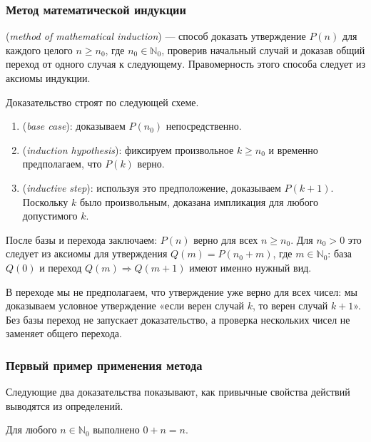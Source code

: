 \subsubsection*{Метод математической индукции}

\begin{definition}
 (\emph{method of mathematical induction}) ---
способ доказать утверждение \(P(n)\) для каждого целого \(n\ge n_0\), где
\(n_0\in\mathbb N_0\), проверив начальный случай и доказав общий переход
от одного случая к следующему. Правомерность этого способа следует из аксиомы индукции.
\end{definition}

Доказательство строят по следующей схеме.
\begin{enumerate}[label=\arabic*.,leftmargin=2em,itemsep=5pt]
\item {} (\emph{base case}): доказываем \(P(n_0)\) непосредственно.
\item {} (\emph{induction hypothesis}):
фиксируем произвольное \(k\ge n_0\) и временно предполагаем, что \(P(k)\) верно.
\item {} (\emph{inductive step}):
используя это предположение, доказываем \(P(k+1)\).
Поскольку \(k\) было произвольным, доказана импликация для любого допустимого \(k\).
\end{enumerate}

После базы и перехода заключаем: \(P(n)\) верно для всех \(n\ge n_0\).
Для \(n_0>0\) это следует из аксиомы для утверждения \(Q(m)=P(n_0+m)\),
где \(m\in\mathbb N_0\): база \(Q(0)\) и переход \(Q(m)\Rightarrow Q(m+1)\)
имеют именно нужный вид.

В переходе мы не предполагаем, что утверждение уже верно для всех чисел:
мы доказываем условное утверждение «если верен случай \(k\), то верен случай \(k+1\)».
Без базы переход не запускает доказательство, а проверка нескольких чисел не заменяет общего перехода.

\subsubsection*{Первый пример применения метода}
Следующие два доказательства показывают, как привычные свойства действий выводятся из определений.

\begin{theorem}
Для любого \(n\in\mathbb N_0\) выполнено \(0+n=n\).
\end{theorem}

